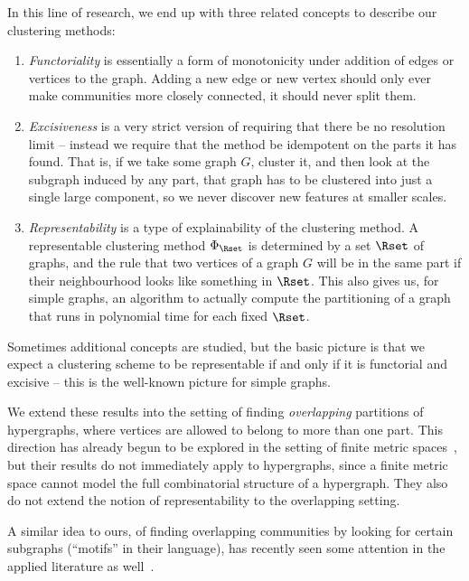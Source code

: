 \documentclass[a4paper,reqno,oneside]{article} %
\begin{document}
In this line of research, we end up with three related concepts to describe our clustering methods:
\begin{enumerate}
    \item \emph{Functoriality} is essentially a form of monotonicity under addition of edges or vertices to the graph. Adding a new edge or new vertex should only ever make communities more closely connected, it should never split them.
    \item \emph{Excisiveness} is a very strict version of requiring that there be no resolution limit -- instead we require that the method be idempotent on the parts it has found. That is, if we take some graph $G$, cluster it, and then look at the subgraph induced by any part, that graph has to be clustered into just a single large component, so we never discover new features at smaller scales.
    \item \emph{Representability} is a type of explainability of the clustering method. A representable clustering method $\Phi_\Rset$ is determined by a set $\Rset$ of graphs, and the rule that two vertices of a graph $G$ will be in the same part if their neighbourhood looks like something in $\Rset$. This also gives us, for simple graphs, an algorithm to actually compute the partitioning of a graph that runs in polynomial time for each fixed $\Rset$.
\end{enumerate}

Sometimes additional concepts are studied, but the basic picture is that we expect a clustering scheme to be representable if and only if it is functorial and excisive -- this is the well-known picture for simple graphs.

We extend these results into the setting of finding \emph{overlapping} partitions of hypergraphs, where vertices are allowed to belong to more than one part. This direction has already begun to be explored in the setting of finite metric spaces~\cite{Culbertson_Guralnik_Hansen_Stiller_2016,Culbertson_Guralnik_Stiller_2018,Shiebler_2020}, but their results do not immediately apply to hypergraphs, since a finite metric space cannot model the full combinatorial structure of a hypergraph. They also do not extend the notion of representability to the overlapping setting.

A similar idea to ours, of finding overlapping communities by looking for certain subgraphs (``motifs'' in their language), has recently seen some attention in the applied literature as well~\cite{Chen_Tsourakakis_2024,Hajibabaei_Seydi_Koochari_2024}.
\end{document}
